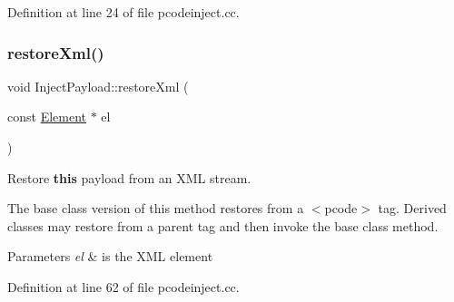 Definition at line 24 of file pcodeinject.\+cc.

\mbox{\label{class_inject_payload_a19811abba789abc6bc1d3b2322709255}} 
\subsubsection{\texorpdfstring{restoreXml()}{restoreXml()}}
{\footnotesize\ttfamily void Inject\+Payload\+::restore\+Xml (\begin{DoxyParamCaption}\item[{const \mbox{\hyperlink{class_element}{Element}} $\ast$}]{el }\end{DoxyParamCaption})\hspace{0.3cm}{\ttfamily [virtual]}}



Restore {\bfseries{this}} payload from an X\+ML stream. 

The base class version of this method restores from a $<$pcode$>$ tag. Derived classes may restore from a parent tag and then invoke the base class method. 
\begin{DoxyParams}{Parameters}
{\em el} & is the X\+ML element \\
\hline
\end{DoxyParams}


Definition at line 62 of file pcodeinject.\+cc.

